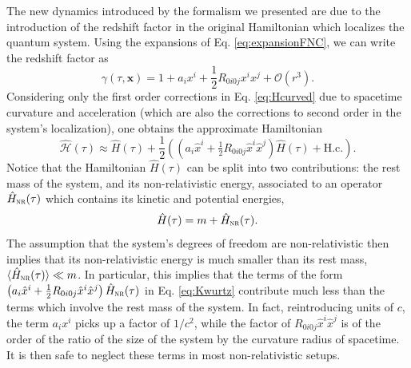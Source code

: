 \documentclass[prd,twocolumn,superscriptaddress,floatfix,amsmath,amssymb,amsfonts,longbibliography,nofootinbib]{revtex4-1}
\begin{document}
The new dynamics introduced by the formalism we presented are due to the introduction of the redshift factor in the original Hamiltonian which localizes the quantum system. Using the expansions of Eq. \eqref{eq:expansionFNC}, we can write the redshift factor as
\begin{equation}
    \gamma(\tau,\bm x) = 1 + a_i x^i + \frac{1}{2} R_{0i0j}x^ix^j + \mathcal{O}(r^3).
\end{equation}
Considering only the first order corrections in Eq. \eqref{eq:Hcurved} due to spacetime curvature and acceleration (which are also the corrections to second order in the system's localization), one obtains the approximate Hamiltonian
\begin{equation}\label{eq:Kwurtz}
    \hat{\mathcal{H}}(\tau) \approx \hat{H}(\tau) + \frac{1}{2}\left(\left(a_i \hat{x}^i + \tfrac{1}{2} R_{0i0j}\hat{x}^i\hat{x}^j\right)\hat{H}(\tau) + \text{H.c.}\right).
\end{equation}
Notice that the Hamiltonian $\hat{H}(\tau)$ can be split into two contributions: the rest mass of the system, and its non-relativistic energy, associated to an operator $\hat{H}_{\textsc{nr}}(\tau)$ which contains its kinetic and potential energies,
\begin{equation}
    \hat{H}(\tau)  = m +\hat{H}_{\textsc{nr}}(\tau).
\end{equation}
The assumption that the system's degrees of freedom are non-relativistic then implies that its non-relativistic energy is much smaller than its rest mass, $\langle\hat{H}_{\textsc{nr}}(\tau)\rangle\ll m$. In particular, this implies that  the terms of the form $\left(a_i \hat{x}^i + \tfrac{1}{2} R_{0i0j}\hat{x}^i\hat{x}^j\right)\hat{H}_{\textsc{nr}}(\tau)$ in Eq. \eqref{eq:Kwurtz} contribute much less than the terms which involve the rest mass of the system. In fact, reintroducing units of $c$, the term $a_i x^i$ picks up a factor of $1/c^2$, while the factor of $R_{0i0j}\hat{x}^i\hat{x}^j$ is of the order of the ratio of the size of the system by the curvature radius of spacetime. It is then safe to neglect these terms in most non-relativistic setups. 
\end{document}
